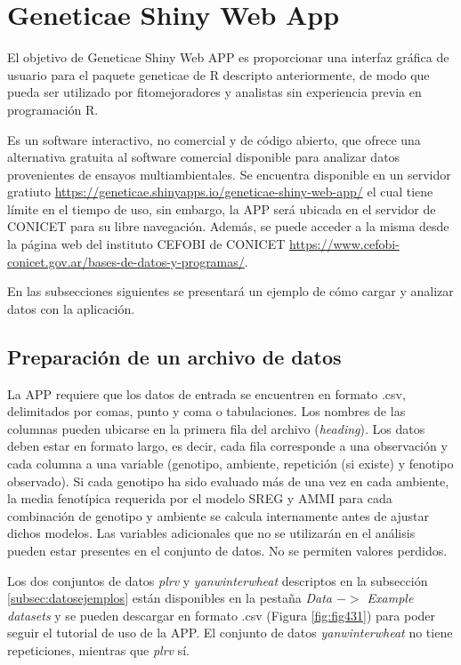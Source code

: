 \section{Geneticae Shiny Web App}

El objetivo de Geneticae Shiny Web APP es proporcionar una interfaz gráfica de usuario para el paquete geneticae de R descripto anteriormente, de modo que pueda ser utilizado por fitomejoradores y analistas sin experiencia previa en programación R. 

Es un software interactivo, no comercial y de código abierto, que ofrece una alternativa gratuita al software comercial disponible para analizar datos provenientes de ensayos multiambientales. Se encuentra disponible en un servidor gratiuto \url{https://geneticae.shinyapps.io/geneticae-shiny-web-app/} el cual tiene límite en el tiempo de uso, sin embargo, la APP será ubicada en el servidor de CONICET para su libre navegación. Además, se puede acceder a la misma desde la página web del instituto CEFOBI de CONICET \url{https://www.cefobi-conicet.gov.ar/bases-de-datos-y-programas/}.

En las subsecciones siguientes se presentará un ejemplo de cómo cargar y analizar datos con la aplicación.


\subsection{Preparación de un archivo de datos}

La APP requiere que los datos de entrada se encuentren en formato .csv, delimitados por comas, punto y coma o tabulaciones. Los nombres de las columnas pueden ubicarse en la primera fila del archivo (\emph{heading}). Los datos deben estar en formato largo, es decir, cada fila corresponde a una observación y cada columna a una variable (genotipo, ambiente, repetición (si existe) y fenotipo observado). Si cada genotipo ha sido evaluado más de una vez en cada ambiente, la media fenotípica requerida por el modelo SREG y AMMI para cada combinación de genotipo y ambiente se calcula internamente antes de ajustar dichos modelos. Las variables adicionales que no se utilizarán en el análisis pueden estar presentes en el conjunto de datos. No se permiten valores perdidos.

Los dos conjuntos de datos \emph{plrv} y \emph{yanwinterwheat} descriptos en la subsección \ref{subsec:datosejemplos} están disponibles en la pestaña \emph{Data $->$ Example datasets} y se pueden descargar en formato .csv (Figura \ref{fig:fig431}) para poder seguir el tutorial de uso de la APP. El conjunto de datos \emph{yanwinterwheat} no tiene repeticiones, mientras que \emph{plrv} sí. 

